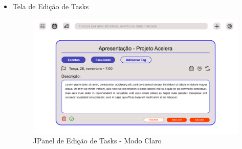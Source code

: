 \documentclass[a4paper,12pt]{article}
\begin{document}
\begin{itemize}
	\item Tela de Edição de Tasks
	\begin{figure}[H]
		\centering
		\includegraphics[scale=0.20]{prototypes/white/Edit Task Panel Window.png}
		\caption{JPanel de Edição de Tasks - Modo Claro}
	\end{figure}
\end{itemize}	
\end{document}
